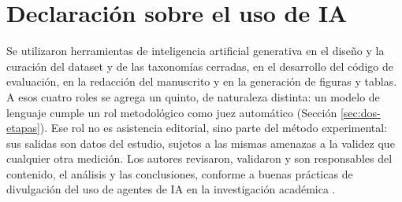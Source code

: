 \section*{Declaración sobre el uso de IA}

Se utilizaron herramientas de inteligencia artificial generativa en el diseño
y la curación del dataset y de las taxonomías cerradas, en el desarrollo del
código de evaluación, en la redacción del manuscrito y en la generación de
figuras y tablas. A esos cuatro roles se agrega un quinto, de naturaleza
distinta: un modelo de lenguaje cumple un rol metodológico como juez
automático (Sección \ref{sec:dos-etapas}). Ese rol no es asistencia
editorial, sino parte del método experimental: sus salidas son datos del
estudio,
sujetos a las mismas amenazas a la validez que cualquier otra medición. Los
autores revisaron, validaron y son responsables del contenido, el análisis y
las conclusiones, conforme a buenas prácticas de divulgación del uso de
agentes de IA en la investigación académica \cite{torassa2025etica}.
